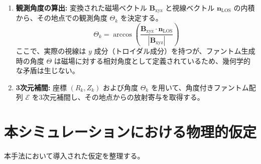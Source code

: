 \documentclass[a4paper,11pt]{bxjsarticle} %
\begin{document}
\begin{enumerate}
    \item \textbf{観測角度の算出:}
    変換された磁場ベクトル $\bm{B}_{\mathrm{xyz}}$ と視線ベクトル $\bm{n}_{\mathrm{LOS}}$ の内積から、その地点での観測角度 $\Theta_k$ を決定する。
    \begin{equation}
        \Theta_k = \arccos\left( \frac{\bm{B}_{\mathrm{xyz}} \cdot \bm{n}_{\mathrm{LOS}}}{|\bm{B}_{\mathrm{xyz}}|} \right)
    \end{equation}
    ここで、実際の視線は $y$ 成分（トロイダル成分）を持つが、ファントム生成時の角度 $\Theta$ は磁場に対する相対角度として定義されているため、幾何学的な矛盾は生じない。
    
    \item \textbf{3次元補間:}
    座標 $(R_k, Z_k)$ および角度 $\Theta_k$ を用いて、角度付きファントム配列 $\mathcal{E}$ を3次元補間し、その地点からの放射寄与を取得する。
\end{enumerate}

\section{本シミュレーションにおける物理的仮定}
本手法において導入された仮定を整理する。
\end{document}
